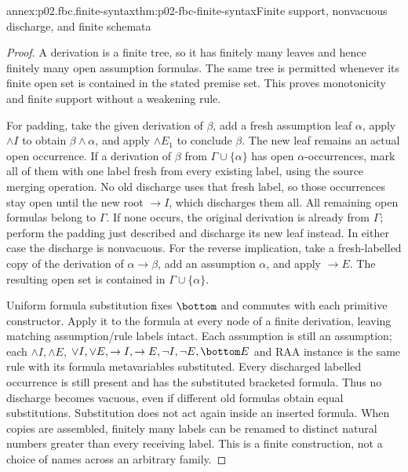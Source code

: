 \begin{annexitem}{annex:p02.fbc.finite-syntax}{thm:p02-fbc-finite-syntax}{Finite support, nonvacuous discharge, and finite schemata}
\begin{proof}
A derivation is a finite tree, so it has finitely many leaves and hence
finitely many open assumption formulas. The same tree is permitted
whenever its finite open set is contained in the stated premise set.
This proves monotonicity and finite support without a weakening rule.

For padding, take the given derivation of \(\beta\), add a fresh
assumption leaf \(\alpha\), apply \(\land I\) to obtain
\(\beta\land\alpha\), and apply \(\land E_1\) to conclude \(\beta\).
The new leaf remains an actual open occurrence.
If a derivation of \(\beta\) from \(\Gamma\cup\{\alpha\}\) has
open \(\alpha\)-occurrences, mark all of them with one label fresh
from every existing label, using the source merging operation.
No old discharge uses that fresh label, so those occurrences stay open
until the new root \(\to I\), which discharges them all.
All remaining open formulas belong to \(\Gamma\).
If none occurs, the original derivation is already from \(\Gamma\);
perform the padding just described and discharge its new leaf instead.
In either case the discharge is nonvacuous.
For the reverse implication, take a fresh-labelled copy of the
derivation of \(\alpha\to\beta\), add an assumption \(\alpha\),
and apply \(\to E\). The resulting open set is contained in
\(\Gamma\cup\{\alpha\}\).

Uniform formula substitution fixes \(\bottom\) and commutes with
each primitive constructor. Apply it to the formula at every node
of a finite derivation, leaving matching assumption/rule labels intact.
Each assumption is still an assumption; each \(\land I,\land E\),
\(\lor I,\lor E,\to I,\to E,\neg I,\neg E,\bottom E\) and RAA
instance is the same rule with its formula metavariables substituted.
Every discharged labelled occurrence is still present and has the
substituted bracketed formula. Thus no discharge becomes vacuous,
even if different old formulas obtain equal substitutions.
Substitution does not act again inside an inserted formula.
When copies are assembled, finitely many labels can be renamed to
distinct natural numbers greater than every receiving label.
This is a finite construction, not a choice of names across an
arbitrary family.


\end{proof}
\end{annexitem}
